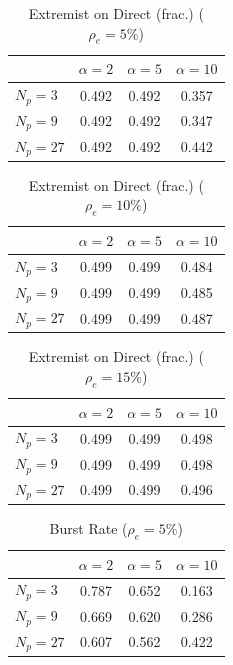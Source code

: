 \begin{table}[htbp]
\centering
\begin{tabular}{lccc}
\toprule
 & $\alpha=2$ & $\alpha=5$ & $\alpha=10$ \\
\midrule
$N_p=3$ & 0.492 & 0.492 & 0.357 \\
$N_p=9$ & 0.492 & 0.492 & 0.347 \\
$N_p=27$ & 0.492 & 0.492 & 0.442 \\
\bottomrule
\end{tabular}
\caption{Extremist on Direct (frac.) ($\rho_e=5\%$)}
\label{tab:exp2_extremist_on_direct_frac_rho5}
\end{table}


\begin{table}[htbp]
\centering
\begin{tabular}{lccc}
\toprule
 & $\alpha=2$ & $\alpha=5$ & $\alpha=10$ \\
\midrule
$N_p=3$ & 0.499 & 0.499 & 0.484 \\
$N_p=9$ & 0.499 & 0.499 & 0.485 \\
$N_p=27$ & 0.499 & 0.499 & 0.487 \\
\bottomrule
\end{tabular}
\caption{Extremist on Direct (frac.) ($\rho_e=10\%$)}
\label{tab:exp2_extremist_on_direct_frac_rho10}
\end{table}


\begin{table}[htbp]
\centering
\begin{tabular}{lccc}
\toprule
 & $\alpha=2$ & $\alpha=5$ & $\alpha=10$ \\
\midrule
$N_p=3$ & 0.499 & 0.499 & 0.498 \\
$N_p=9$ & 0.499 & 0.499 & 0.498 \\
$N_p=27$ & 0.499 & 0.499 & 0.496 \\
\bottomrule
\end{tabular}
\caption{Extremist on Direct (frac.) ($\rho_e=15\%$)}
\label{tab:exp2_extremist_on_direct_frac_rho15}
\end{table}


\begin{table}[htbp]
\centering
\begin{tabular}{lccc}
\toprule
 & $\alpha=2$ & $\alpha=5$ & $\alpha=10$ \\
\midrule
$N_p=3$ & 0.787 & 0.652 & 0.163 \\
$N_p=9$ & 0.669 & 0.620 & 0.286 \\
$N_p=27$ & 0.607 & 0.562 & 0.422 \\
\bottomrule
\end{tabular}
\caption{Burst Rate ($\rho_e=5\%$)}
\label{tab:exp2_burst_rate_rho5}
\end{table}


